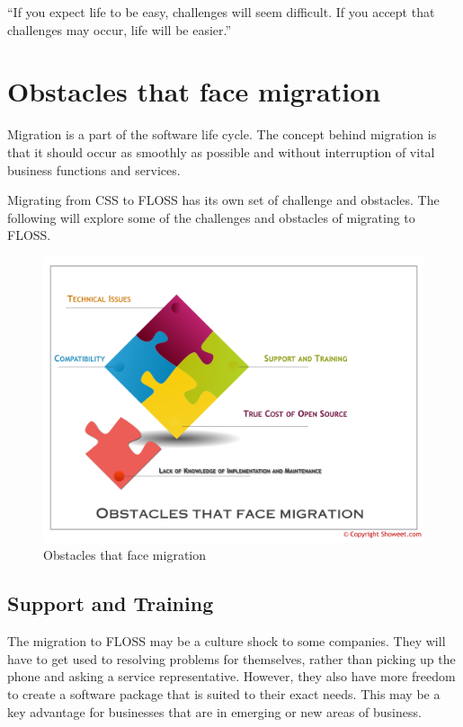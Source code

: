  \newpage
 \begin{savequote}[108mm]
``If you expect life to be easy, challenges will seem difficult. If you accept that challenges may occur, life will be easier.''
\end{savequote}
 \chapter{Obstacles that face migration}
 \label{chap:Obstacles}
 \vspace{-2cm}
 Migration is a part of the software life cycle. The concept behind migration is that it should occur as smoothly as possible and without interruption of vital business functions and services.

 Migrating from CSS to FLOSS has its own set of challenge and obstacles. The following will explore some of the challenges and obstacles of migrating to FLOSS. 
 
   \begin{figure}
    \centering
        \includegraphics[scale=0.6,angle=90]{img/obsticals.png}
      \caption{Obstacles that face migration}
      \label{fig:Obstacles}
    \end{figure}

 \section{Support and Training}
 \label{sec:Support}


 The migration to FLOSS may be a culture shock to some companies. They will have to get used to resolving problems for themselves, rather than picking up the phone and asking a service representative. However, they also have more freedom to create a software package that is suited to their exact needs. This may be a key advantage for businesses that are in emerging or new areas of business. 

